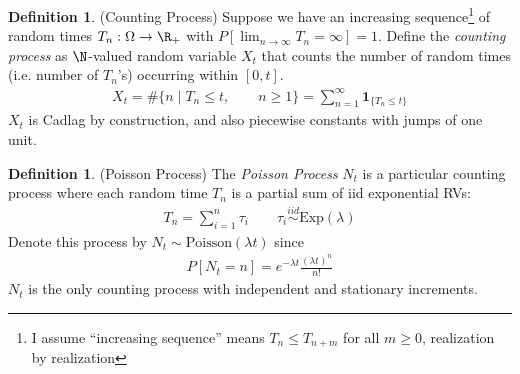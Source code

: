 \documentclass[12pt]{article}
\theoremstyle{plain}
\theoremstyle{definition}
\newtheorem{defn}[thm]{Definition}
\theoremstyle{remark}
\newcommand{\ra}{\rightarrow}
\newcommand{\iid}{\overset{iid}{\sim}}
\newcommand{\sumin}{\sum^n_{i=1}}
\newcommand{\sumninf}{\sum^\infty_{n=1}}
\newcommand{\limn}{\lim_{n\rightarrow\infty}}
\begin{document}
\begin{defn}(Counting Process)
Suppose we have an increasing sequence\footnote{%
  I assume ``increasing sequence'' means $T_n\leq T_{n+m}$ for all
  $m\geq 0$, realization by realization
}
of random times $T_n:\Omega\ra\R_+$ with
$P[\limn T_n=\infty]=1$.
Define the \emph{counting process} as $\N$-valued random variable $X_t$
that counts the number of random times (i.e. number of $T_n$'s)
occurring within $[0,t]$.
\begin{align*}
  X_t
  =
  \#\{
    n
    \;|\;
    T_n\leq t,
    \qquad n\geq 1
  \}
  =
  \sumninf
  \mathbf{1}_{\{T_n\leq t\}}
\end{align*}
$X_t$ is Cadlag by construction, and also piecewise constants with jumps
of one unit.
\end{defn}


\begin{defn}(Poisson Process)
The \emph{Poisson Process} $N_t$ is a particular counting process where
each random time $T_n$ is a partial sum of iid exponential RVs:
\begin{align*}
  T_n = \sumin \tau_i
  \qquad
  \tau_i\iid \text{Exp}(\lambda)
\end{align*}
Denote this process by $N_t\sim\text{Poisson}(\lambda t)$ since
\begin{align*}
  P[N_t=n]
  =
  e^{-\lambda t}
  \frac{(\lambda t)^n}{n!}
\end{align*}
$N_t$ is the only counting process with independent and stationary
increments.
\end{defn}
\end{document}

